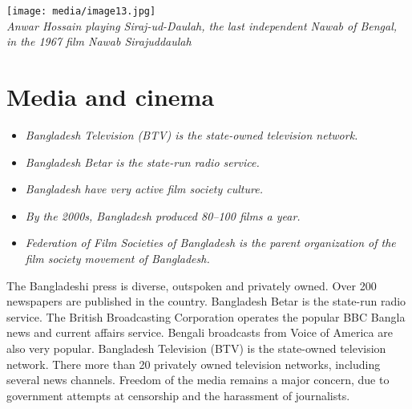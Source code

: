 \texttt{[image: media/image13.jpg]}\\
\emph{Anwar Hossain playing Siraj-ud-Daulah, the last independent Nawab
of Bengal, in the 1967 film Nawab Sirajuddaulah}

\section{Media and cinema}\label{media-and-cinema}

\begin{itemize}
\item
  \emph{Bangladesh Television (BTV) is the state-owned television
  network.}
\item
  \emph{Bangladesh Betar is the state-run radio service.}
\item
  \emph{Bangladesh have very active film society culture.}
\item
  \emph{By the 2000s, Bangladesh produced 80--100 films a year.}
\item
  \emph{Federation of Film Societies of Bangladesh is the parent
  organization of the film society movement of Bangladesh.}
\end{itemize}

The Bangladeshi press is diverse, outspoken and privately owned. Over
200 newspapers are published in the country. Bangladesh Betar is the
state-run radio service. The British Broadcasting Corporation operates
the popular BBC Bangla news and current affairs service. Bengali
broadcasts from Voice of America are also very popular. Bangladesh
Television (BTV) is the state-owned television network. There more than
20 privately owned television networks, including several news channels.
Freedom of the media remains a major concern, due to government attempts
at censorship and the harassment of journalists.

